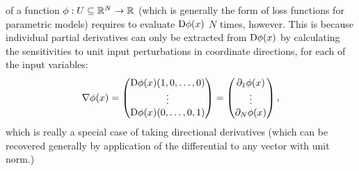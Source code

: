  of a function \(\phi: U \subseteq \mathbb{R}^N \to \mathbb{R}\) (which
is generally the form of loss functions for parametric models) requires to evaluate \(\mathop{}\!\mathrm{D} \phi(x)\)
\(N\) times, however.  This is because individual partial derivatives can only be extracted from
\(\mathop{}\!\mathrm{D} \phi(x)\) by calculating the sensitivities to unit input perturbations in coordinate
directions, for each of the input variables:
\begin{equation}
  \nabla \phi(x) = \begin{pmatrix}
    \mathop{}\!\mathrm{D} \phi(x)(1, 0, \ldots, 0)  \\
    \vdots \\
    \mathop{}\!\mathrm{D} \phi(x)(0, \ldots, 0, 1)
  \end{pmatrix} = \begin{pmatrix}
    \partial_1 \phi(x) \\
    \vdots \\
    \partial_N \phi(x)
  \end{pmatrix},
\end{equation}
which is really a special case of taking directional derivatives (which can be recovered generally
by application of the differential to any vector with unit norm.)

